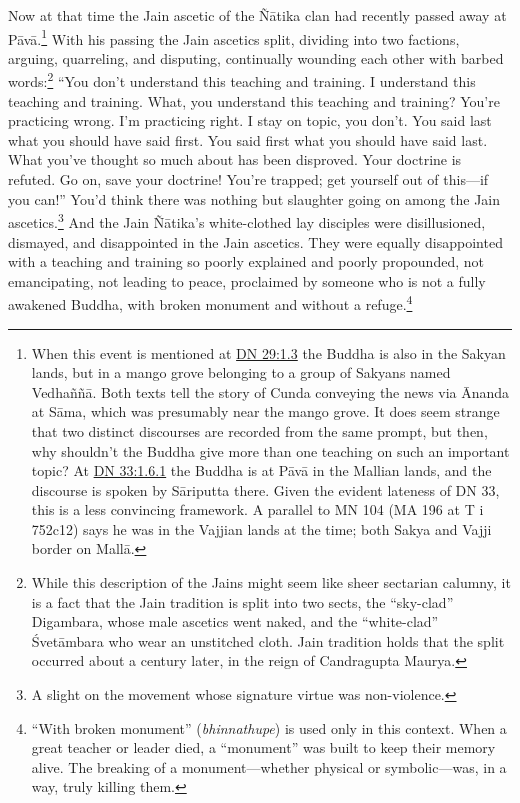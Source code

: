 \documentclass[12pt,openany]{book}%
\begin{document}
Now at that time the Jain ascetic of the \textsanskrit{Ñātika} clan had recently passed away at \textsanskrit{Pāvā}.\footnote{When this event is mentioned at \href{https://suttacentral.net/dn29/en/sujato\#1.3}{DN 29:1.3} the Buddha is also in the Sakyan lands, but in a mango grove belonging to a group of Sakyans named \textsanskrit{Vedhaññā}. Both texts tell the story of Cunda conveying the news via Ānanda at \textsanskrit{Sāma}, which was presumably near the mango grove. It does seem strange that two distinct discourses are recorded from the same prompt, but then, why shouldn’t the Buddha give more than one teaching on such an important topic? At \href{https://suttacentral.net/dn33/en/sujato\#1.6.1}{DN 33:1.6.1} the Buddha is at \textsanskrit{Pāvā} in the Mallian lands, and the discourse is spoken by \textsanskrit{Sāriputta} there. Given the evident lateness of DN 33, this is a less convincing framework. A parallel to MN 104 (MA 196 at T i 752c12) says he was in the Vajjian lands at the time; both Sakya and Vajji border on \textsanskrit{Mallā}. } With his passing the Jain ascetics split, dividing into two factions, arguing, quarreling, and disputing, continually wounding each other with barbed words:\footnote{While this description of the Jains might seem like sheer sectarian calumny, it is a fact that the Jain tradition is split into two sects, the “sky-clad” Digambara, whose male ascetics went naked, and the “white-clad” \textsanskrit{Śvetāmbara} who wear an unstitched cloth. Jain tradition holds that the split occurred about a century later, in the reign of Candragupta Maurya. } “You don’t understand this teaching and training. I understand this teaching and training. What, you understand this teaching and training? You’re practicing wrong. I’m practicing right. I stay on topic, you don’t. You said last what you should have said first. You said first what you should have said last. What you’ve thought so much about has been disproved. Your doctrine is refuted. Go on, save your doctrine! You’re trapped; get yourself out of this—if you can!” You’d think there was nothing but slaughter going on among the Jain ascetics.\footnote{A slight on the movement whose signature virtue was non-violence. } And the Jain \textsanskrit{Ñātika}’s white-clothed lay disciples were disillusioned, dismayed, and disappointed in the Jain ascetics. They were equally disappointed with a teaching and training so poorly explained and poorly propounded, not emancipating, not leading to peace, proclaimed by someone who is not a fully awakened Buddha, with broken monument and without a refuge.\footnote{“With broken monument” (\textit{bhinnathupe}) is used only in this context. When a great teacher or leader died, a “monument” was built to keep their memory alive. The breaking of a monument—whether physical or symbolic—was, in a way, truly killing them. } 
\end{document}
